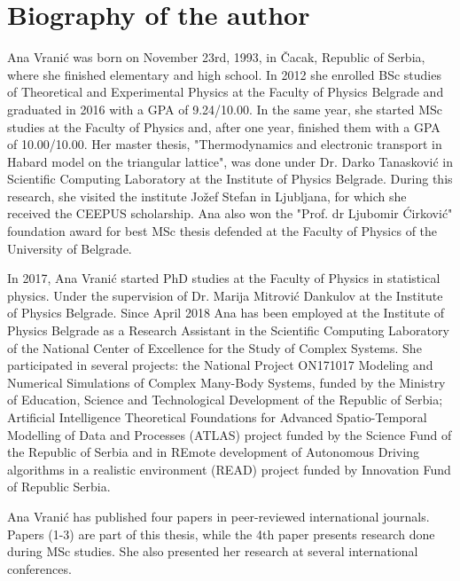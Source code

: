 
\normalsize

\chapter{Biography of the author}

Ana Vranić was born on November 23rd, 1993, in Čacak, Republic of Serbia, where she finished elementary and high school. In 2012 she enrolled BSc studies of Theoretical and Experimental Physics at the Faculty of Physics Belgrade and graduated in 2016 with a GPA of 9.24/10.00. In the same year, she started MSc studies at the Faculty of Physics and, after one year, finished them with a GPA of 10.00/10.00. Her master thesis, "Thermodynamics and electronic transport in Habard model on the triangular lattice", was done under Dr. Darko Tanasković in Scientific Computing Laboratory at the Institute of Physics Belgrade. During this research, she visited the institute Jožef Stefan in Ljubljana, for which she received the CEEPUS scholarship. Ana also won the "Prof. dr Ljubomir Ćirković" foundation award for best MSc thesis defended at the Faculty of Physics of the University of Belgrade.

In 2017, Ana Vranić started PhD studies at the Faculty of Physics in statistical physics. Under the supervision of Dr. Marija Mitrović Dankulov at the Institute of Physics Belgrade. Since April 2018 Ana has been employed at the Institute of Physics Belgrade as a Research Assistant in the Scientific Computing Laboratory of the National Center of Excellence for the Study of Complex Systems. She participated in several projects:  the National Project ON171017 Modeling and Numerical Simulations of Complex Many-Body Systems, funded by the Ministry of Education, Science and Technological Development of the Republic of Serbia; Artificial Intelligence Theoretical Foundations for Advanced Spatio-Temporal Modelling of Data and Processes (ATLAS) project funded by the Science Fund of the Republic of Serbia and in REmote development of Autonomous Driving algorithms in a realistic environment (READ) project funded by Innovation Fund of Republic Serbia.

Ana Vranić has published four papers in peer-reviewed international journals. Papers (1-3) are part of this thesis, while the 4th paper presents research done during MSc studies. She also presented her research at several international conferences.

